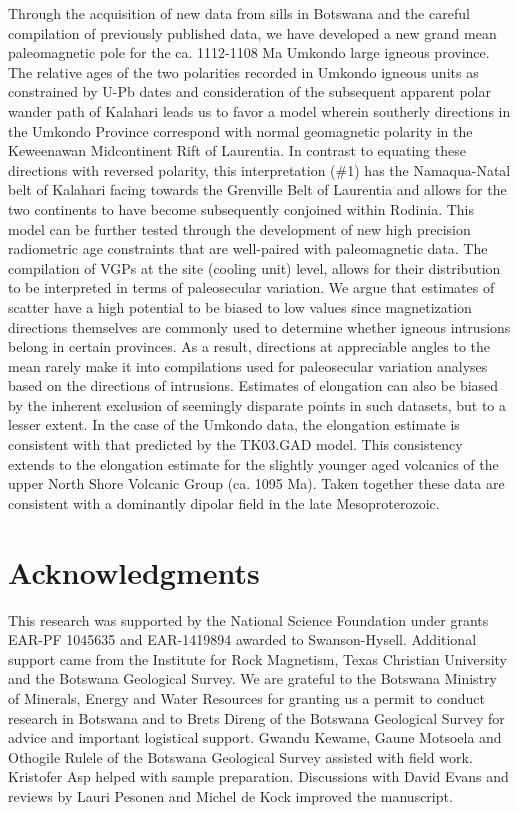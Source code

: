 \documentclass[11pt,letterpaper]{article}
\begin{document}
Through the acquisition of new data from sills in Botswana and the careful compilation of previously published data, we have developed a new grand mean paleomagnetic pole for the ca. 1112-1108 Ma Umkondo large igneous province. The relative ages of the two polarities recorded in Umkondo igneous units as constrained by U-Pb dates and consideration of the subsequent apparent polar wander path of Kalahari leads us to favor a model wherein southerly directions in the Umkondo Province correspond with normal geomagnetic polarity in the Keweenawan Midcontinent Rift of Laurentia. In contrast to equating these directions with reversed polarity, this interpretation ($\#$1) has the Namaqua-Natal belt of Kalahari facing towards the Grenville Belt of Laurentia and allows for the two continents to have become subsequently conjoined within Rodinia. This model can be further tested through the development of new high precision radiometric age constraints that are well-paired with paleomagnetic data. The compilation of VGPs at the site (cooling unit) level, allows for their distribution to be interpreted in terms of paleosecular variation. We argue that estimates of scatter have a high potential to be biased to low values since magnetization directions themselves are commonly used to determine whether igneous intrusions belong in certain provinces. As a result, directions at appreciable angles to the mean rarely make it into compilations used for paleosecular variation analyses based on the directions of intrusions. Estimates of elongation can also be biased by the inherent exclusion of seemingly disparate points in such datasets, but to a lesser extent. In the case of the Umkondo data, the elongation estimate is consistent with that predicted by the TK03.GAD model. This consistency extends to the elongation estimate for the slightly younger aged volcanics of the upper North Shore Volcanic Group (ca. 1095 Ma). Taken together these data are consistent with a dominantly dipolar field in the late Mesoproterozoic. 

\section*{Acknowledgments}
This research was supported by the National Science Foundation under grants EAR-PF 1045635 and EAR-1419894 awarded to Swanson-Hysell. Additional support came from the Institute for Rock Magnetism, Texas Christian University and the Botswana Geological Survey. We are grateful to the Botswana Ministry of Minerals, Energy and Water Resources for granting us a permit to conduct research in Botswana and to Brets Direng of the Botswana Geological Survey for advice and important logistical support. Gwandu Kewame, Gaune Motsoela and Othogile Rulele of the Botswana Geological Survey assisted with field work. Kristofer Asp helped with sample preparation. Discussions with David Evans and reviews by Lauri Pesonen and Michel de Kock improved the manuscript. 
\end{document}

